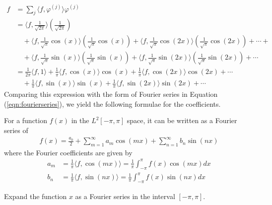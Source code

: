 \begin{align*}
f &= \sum_{j} \langle f, \varphi^{(j)} \rangle \varphi^{(j)} \\ 
&= \langle f, \frac{1}{\sqrt{2\pi}} \rangle (\frac{1}{\sqrt{2\pi}})\\
&\quad + \langle f, \frac{1}{\sqrt{\pi}}\cos(x) \rangle (\frac{1}{\sqrt{\pi}}\cos(x)) + \langle f, \frac{1}{\sqrt{\pi}}\cos(2x) \rangle (\frac{1}{\sqrt{\pi}}\cos(2x)) + \cdots + \\
&\quad + \langle f, \frac{1}{\sqrt{\pi}}\sin(x) \rangle (\frac{1}{\sqrt{\pi}}\sin(x)) + \langle f, \frac{1}{\sqrt{\pi}}\sin(2x) \rangle (\frac{1}{\sqrt{\pi}}\sin(2x)) + \cdots \\
&= \frac{1}{2\pi} \langle f, 1 \rangle + \frac{1}{\pi} \langle f, \cos(x) \rangle \cos(x) + \frac{1}{\pi} \langle f, \cos(2x) \rangle \cos(2x) + \cdots \\
&\quad + \frac{1}{\pi}\langle f, \sin(x) \rangle \sin(x) + \frac{1}{\pi}\langle f, \sin(2x) \rangle \sin(2x) + \cdots
\end{align*}
Comparing this expression with the form of Fourier series in Equation (\ref{eqn:fourierseries}), we yield the following formulae for the coefficients.
\begin{proper}
\label{proper:fourierseries}
For a function $f(x)$ in the $L^2[-\pi, \pi]$ space, it can be written as a Fourier series of
\begin{align*}
f(x) = \frac{a_0}{2} + \sum_{m=1}^{\infty} a_m \cos(mx) + \sum_{n=1}^{\infty} b_n \sin(nx) 
\end{align*}
where the Fourier coefficients are given by
\begin{align}
a_m &= \frac{1}{\pi}\langle f, \cos(mx) \rangle = \frac{1}{\pi} \int_{-\pi}^{\pi} f(x)\cos(mx) dx \label{eqn:fouriera} \\
b_n &= \frac{1}{\pi}\langle f, \sin(nx) \rangle = \frac{1}{\pi} \int_{-\pi}^{\pi} f(x)\sin(nx) dx \label{eqn:fourierb}
\end{align}    
\end{proper}
\begin{exmp}
\label{exmp:fourierx}
Expand the function $x$ as a Fourier series in the interval $[-\pi, \pi]$.
\end{exmp}
